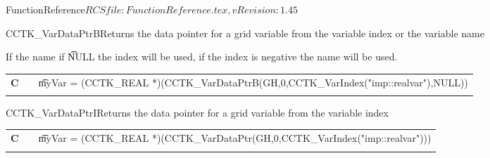 \begin{cactuspart}{5}{FunctionReference}{$RCSfile: FunctionReference.tex,v $}{$Revision: 1.45 $}
\begin{CCTKFunc}{CCTK\_VarDataPtrB}{Returns the data pointer for a grid variable from the variable index or the variable name}
\label{CCTK-VarDataPtrB}
\showcargs
\begin{params}
\end{params}
\begin{discussion}
If the name if {\t NULL} the index will be used, if the index is negative the name will be used.
\end{discussion}
\begin{examples}
\begin{tabular}{@{}p{3cm}cp{11cm}}
\hfill {\bf C} && {\t myVar = (CCTK\_REAL *)(CCTK\_VarDataPtrB(GH,0,CCTK\_VarIndex("imp::realvar"),NULL))}\\
\\
\end{tabular}
\end{examples}
\begin{errorcodes}
\end{errorcodes}
\end{CCTKFunc}


\begin{CCTKFunc}{CCTK\_VarDataPtrI}{Returns the data pointer for a grid variable from the variable index}
\label{CCTK-VarDataPtrI}
\showcargs
\begin{params}
\end{params}
\begin{discussion}
\end{discussion}
\begin{examples}
\begin{tabular}{@{}p{3cm}cp{11cm}}
\hfill {\bf C} && {\t myVar = (CCTK\_REAL *)(CCTK\_VarDataPtr(GH,0,CCTK\_VarIndex("imp::realvar")))}\\
\\
\end{tabular}
\end{examples}
\begin{errorcodes}
\end{errorcodes}
\end{CCTKFunc}



\end{cactuspart}
